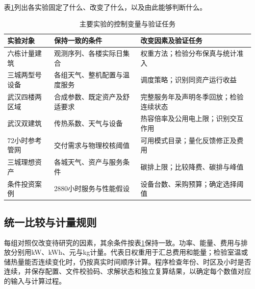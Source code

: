 表\ref{tab:experiment-design}列出各实验固定了什么、改变了什么，以及由此能够判断什么。

\begin{table}[htbp]
\centering
\caption{主要实验的控制变量与验证任务}\label{tab:experiment-design}
\begin{tabularx}{\textwidth}{@{}>{\raggedright\arraybackslash}p{}XX@{}}
\toprule
实验对象 & 保持一致的条件 & 改变因素及验证任务\\
\midrule
六栋计量建筑 & 观测序列、各楼实际日集合 & 权重方法；检验分布保真与统计准入\\
三城两型号设备 & 各组天气、整机配置与温度服务 & 调度策略；识别同资产运行收益\\
武汉四楼两区域 & 合成参数、既定资产及舒适要求 & 完整服务年及声明冬季回放；检验连续状态\\
武汉双建筑 & 传热系数、天气与设备 & 热容倍率及公用电上限；识别交互作用\\
72小时参考管网 & 交付需求与物理校核阈值 & 可用模式目录；量化反馈修正及费用\\
三城理想资产 & 各城天气、资产与服务条件 & 碳排上限；比较降费、碳排与峰值\\
条件投资案例 & 2880小时服务与性能假设 & 设备台数、采购预算；确定选择阈值\\
\bottomrule
\end{tabularx}
\end{table}

\subsection{统一比较与计量规则}

每组对照仅改变待研究的因素，其余条件按表\ref{tab:experiment-design}保持一致。功率、能量、费用与排放分别用kW、kWh、元与kg计量。代表日权重用于汇总费用和能量；检验室温或储热量能否连续变化时，仍按真实时间顺序计算。程序检查年份、时区及小时是否连续，并保存配置、文件校验码、求解状态和独立复算结果，以确定每个数值对应的输入与计算过程。
